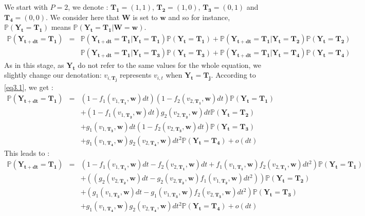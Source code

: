 We start with $P=2$, we denote : $\mathbf{T_1}=(1,1)$, $\mathbf{T_2}=(1,0)$, $\mathbf{T_3}=(0,1)$ and $\mathbf{T_4}=(0,0)$. We consider here that $\mathbf{W}$ is set to $\mathbf{w}$ and so for instance, $\mathbb{P}(\mathbf{\mathbf{Y_t}}=\mathbf{T_1})$ means $\mathbb{P}(\mathbf{\mathbf{Y_t}}=\mathbf{T_1}|\mathbf{W}=\mathbf{w})$.
\begin{eqnarray}
\nonumber \mathbb{P}(\mathbf{Y_{t+dt}}=\mathbf{T_1})&=&\mathbb{P}(\mathbf{Y_{t+dt}}=\mathbf{T_1}|\mathbf{Y_t}=\mathbf{T_1})\mathbb{P}(\mathbf{Y_t}=\mathbf{T_1})+\mathbb{P}(\mathbf{Y_{t+dt}}=\mathbf{T_1}|\mathbf{Y_t}=\mathbf{T_2})\mathbb{P}(\mathbf{Y_t}=\mathbf{T_2}) \\
\label{eq5.1}  & &  \mathbb{P}(\mathbf{Y_{t+dt}}=\mathbf{T_1}|\mathbf{Y_t}=\mathbf{T_3})\mathbb{P}(\mathbf{Y_t}=\mathbf{T_3})+\mathbb{P}(\mathbf{Y_{t+dt}}=\mathbf{T_1}|\mathbf{Y_t}=\mathbf{T_4})\mathbb{P}(\mathbf{Y_t}=\mathbf{T_4})
\end{eqnarray}
As in this stage, as $\mathbf{Y_t}$ do not refer to the same values for the whole equation, we slightly change our denotation: $v_{i,\mathbf{T_j}}$ represents $v_{i,t}$ when $\mathbf{Y_t}=\mathbf{T_j}$. According to \eqref{eq3.1}, we get :
\begin{eqnarray}
\label{eq5.2} \mathbb{P}(\mathbf{Y_{t+dt}}=\mathbf{T_1})&=&(1-f_1(v_{1,\mathbf{T_1}},\mathbf{w})dt)(1-f_2(v_{2,\mathbf{T_1}},\mathbf{w})dt)\mathbb{P}(\mathbf{Y_t}=\mathbf{T_1})\\
\nonumber & & +(1-f_1(v_{1,\mathbf{T_2}},\mathbf{w})dt)g_2(v_{2,\mathbf{T_2}},\mathbf{w})dt \mathbb{P}(\mathbf{Y_t}=\mathbf{T_2}) \\
\nonumber & & +g_1(v_{1,\mathbf{T_3}},\mathbf{w})dt(1-f_2(v_{2,\mathbf{T_3}},\mathbf{w})dt)\mathbb{P}(\mathbf{Y_t}=\mathbf{T_3}) \\
\nonumber & & +g_1(v_{1,\mathbf{T_4}},\mathbf{w})g_2(v_{2,\mathbf{T_4}},\mathbf{w})dt^2\mathbb{P}(\mathbf{Y_t}=\mathbf{T_4}) +o(dt)
\end{eqnarray}
This leads to :
\begin{eqnarray}
\label{eq5.3} \nonumber \mathbb{P}(\mathbf{Y_{t+dt}}=\mathbf{T_1})&=&(1-f_1(v_{1,\mathbf{T_1}},\mathbf{w})dt-f_2(v_{2,\mathbf{T_1}},\mathbf{w})dt+f_1(v_{1,\mathbf{T_1}},\mathbf{w})f_2(v_{2,\mathbf{T_1}},\mathbf{w})dt^2)\mathbb{P}(\mathbf{Y_t}=\mathbf{T_1})\\
\nonumber & & +((g_2(v_{2,\mathbf{T_2}},\mathbf{w})dt-g_2(v_{2,\mathbf{T_2}},\mathbf{w})f_1(v_{1,\mathbf{T_2}},\mathbf{w})dt^2))\mathbb{P}(\mathbf{Y_t}=\mathbf{T_2}) \\
\nonumber & & +(g_1(v_{1,\mathbf{T_3}},\mathbf{w})dt-g_1(v_{1,\mathbf{T_3}},\mathbf{w})f_2(v_{2,\mathbf{T_3}},\mathbf{w})dt^2)\mathbb{P}(\mathbf{Y_t}=\mathbf{T_3}) \\
& & +g_1(v_{1,\mathbf{T_4}},\mathbf{w})g_2(v_{2,\mathbf{T_4}},\mathbf{w})dt^2\mathbb{P}(\mathbf{Y_t}=\mathbf{T_4})+o(dt)
\end{eqnarray}
